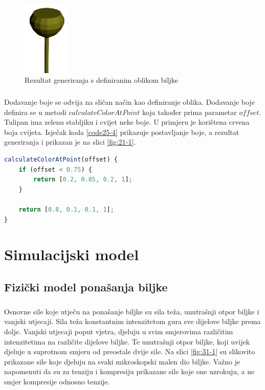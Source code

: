 \documentclass[times, utf8, diplomski]{fer}
\begin{document}
\begin{figure}[h]
	\centering
	\includegraphics[width=0.2\textwidth]{img/25-3}
	\caption{Rezultat generiranja s definiranim oblikom biljke}
	\label{fig:25-3}
\end{figure}
\paragraph{}
Dodavanje boje se odvija na sličan način kao definiranje oblika. Dodavanje boje definira se 
u metodi $calculateColorAtPoint$ koja također prima parametar $offset$. Tulipan ima zelenu 
stabljiku i cvijet neke boje. U primjeru je korištena crvena boja cvijeta. Isječak koda 
\ref{code25-4} prikazuje postavljanje boje, a rezultat generiranja i prikazan je na slici 
\ref{fig:21-1}.

\begin{lstlisting}[language=Javascript,caption=Dodavanje boja modelu,label=code25-4]
calculateColorAtPoint(offset) {
	if (offset < 0.75) {
		return [0.2, 0.85, 0.2, 1];
	}

	return [0.8, 0.1, 0.1, 1];
}
\end{lstlisting}


\chapter{Simulacijski model}
\section{Fizički model ponašanja biljke}
\paragraph{}
Osnovne sile koje utječu na ponašanje biljke su sila teža, unutrašnji otpor 
biljke i vanjski utjecaji. Sila teža konstantnim intenzitetom gura sve dijelove 
biljke prema dolje. Vanjski utjecaji poput vjetra, djeluju u svim smjerovima 
različitim intenzitetima na različite dijelove biljke. Te unutrašnji otpor 
biljke, koji uvijek djeluje u suprotnom smjeru od preostale dvije sile. Na 
slici \ref{fig:31-1} su slikovito prikazane sile koje djeluju na svaki mikroskopski malen 
dio biljke. Važno je napomenuti da su za tenziju i kompresiju prikazane sile koje one 
uzrokuju, a ne smjer kompresije odnosno tenzije.
\end{document}
